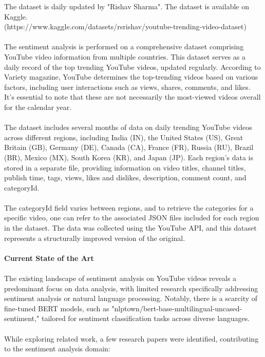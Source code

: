 \documentclass[12pt]{article}
\begin{document}
{The dataset is daily updated by "Rishav Sharma". The dataset is available on Kaggle.\\ (https://www.kaggle.com/datasets/rsrishav/youtube-trending-video-dataset)\\ \\
{The sentiment analysis is performed on a comprehensive dataset comprising YouTube video information from multiple countries. This dataset serves as a daily record of the top trending YouTube videos, updated regularly. According to Variety magazine, YouTube determines the top-trending videos based on various factors, including user interactions such as views, shares, comments, and likes. It's essential to note that these are not necessarily the most-viewed videos overall for the calendar year.}\\ \\
{The dataset includes several months of data on daily trending YouTube videos across different regions, including India (IN), the United States (US), Great Britain (GB), Germany (DE), Canada (CA), France (FR), Russia (RU), Brazil (BR), Mexico (MX), South Korea (KR), and Japan (JP). Each region's data is stored in a separate file, providing information on video titles, channel titles, publish time, tags, views, likes and dislikes, description, comment count, and categoryId.}\\ \\
{The categoryId field varies between regions, and to retrieve the categories for a specific video, one can refer to the associated JSON files included for each region in the dataset. The data was collected using the YouTube API, and this dataset represents a structurally improved version of the original.}\\ \\
{\bf \large Current State of the Art}\\ \\
{The existing landscape of sentiment analysis on YouTube videos reveals a predominant focus on data analysis, with limited research specifically addressing sentiment analysis or natural language processing. Notably, there is a scarcity of fine-tuned BERT models, such as "nlptown/bert-base-multilingual-uncased-sentiment," tailored for sentiment classification tasks across diverse languages.}\\ \\
{While exploring related work, a few research papers were identified, contributing to the sentiment analysis domain:}
\begin{itemize}

\end{itemize}}
\end{document}
